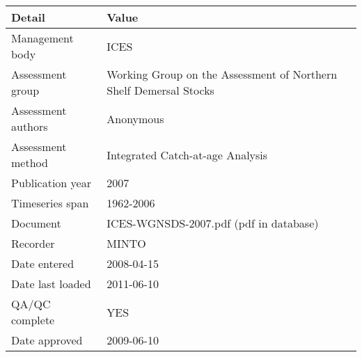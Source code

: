 \begin{table}[htb]
\centering
\begin{tabular}{lp{7cm}}
\toprule
Detail & Value \\
\midrule
Management body    & ICES                                                              \\
Assessment group   & Working Group on the Assessment of Northern Shelf Demersal Stocks \\
Assessment authors & Anonymous                                                         \\
Assessment method  & Integrated Catch-at-age Analysis                                  \\
Publication year   & 2007                                                              \\
Timeseries span    & 1962-2006                                                         \\
Document           & ICES-WGNSDS-2007.pdf (pdf in database)                            \\
Recorder           & MINTO                                                             \\
Date entered       & 2008-04-15                                                        \\
Date last loaded   & 2011-06-10                                                        \\
QA/QC complete     & YES                                                               \\
Date approved      & 2009-06-10                                                        \\
\bottomrule
\end{tabular}
\label{tab:assessdet}
\end{table}
